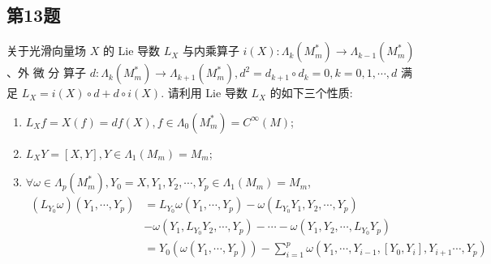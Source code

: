 \subsection{第13题}
\begin{example}[][第13题][exam:13]
关于光滑向量场 $X$ 的 Lie 导数 $L_X$ 与内乘算子 $i(X): \Lambda_k\left(M_m^*\right) \rightarrow \Lambda_{k-1}\left(M_m^*\right)$ 、外 微 分 算子 $d: \Lambda_k\left(M_m^*\right) \rightarrow \Lambda_{k+1}\left(M_m^*\right), d^2=d_{k+1} \circ d_k=0, k=0,1, \cdots, d$ 满 足 $L_X=i(X) \circ d+d \circ i(X)$. 请利用 Lie 导数 $L_X$ 的如下三个性质:
\begin{enumerate}[label=\roman*),font=\upshape]
\item  $L_X f=X(f)=d f(X), f \in \Lambda_0\left(M_m^*\right)=C^{\infty}(M)$;
\item $L_X Y=[X, Y], Y \in \Lambda_1\left(M_m\right)=M_m$;
\item $\forall \omega \in \Lambda_p\left(M_m^*\right), Y_0=X, Y_1, Y_2, \cdots, Y_p \in \Lambda_1\left(M_m\right)=M_m$,
\begin{align*}
\left(L_{Y_0} \omega\right)\left(Y_1, \cdots, Y_p\right)
&=L_{Y_0} \omega\left(Y_1, \cdots, Y_p\right)-\omega\left(L_{Y_0} Y_1, Y_2, \cdots, Y_p\right)\\
&-\omega\left(Y_1, L_{Y_0} Y_2, \cdots, Y_p\right)-\cdots-\omega\left(Y_1, Y_2, \cdots, L_{Y_0} Y_p\right) \\
&=Y_0\left(\omega\left(Y_1, \cdots, Y_p\right)\right)-\sum_{i=1}^p \omega\left(Y_1, \cdots, Y_{i-1},\left[Y_0, Y_i\right], Y_{i+1} \cdots, Y_p\right)
\end{align*}
\end{enumerate}
\end{example}


